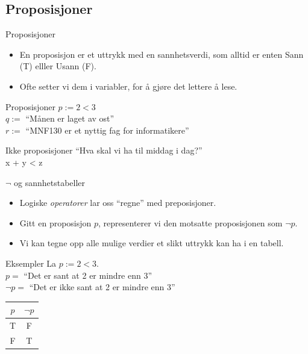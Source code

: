 \subsection{Proposisjoner}

\begin{frame}{Proposisjoner}
    \begin{itemize}
        \item En proposisjon er et uttrykk med en sannhetsverdi, som alltid er enten Sann (T) elller Usann (F).
        \item Ofte setter vi dem i variabler, for å gjøre det lettere å lese.
    \end{itemize}
    \pause
    \begin{block}{Proposisjoner}
        $p := 2 < 3$ \\
        $q := $ ``Månen er laget av ost''\\
        $r := $ ``MNF130 er et nyttig fag for informatikere''
    \end{block}
    \pause
    \begin{block}{Ikke proposisjoner}
        ``Hva skal vi ha til middag i dag?''\\
        x + y < z
    \end{block}
\end{frame}

\begin{frame}{$\lnot$ og sannhetstabeller}
    \begin{itemize}
        \item Logiske \emph{operatorer} lar oss ``regne'' med preposisjoner.
        \item Gitt en proposisjon $p$, representerer vi den motsatte proposisjonen som $\lnot p$.
        \item Vi kan tegne opp alle mulige verdier et slikt uttrykk kan ha i en tabell.
    \end{itemize}
    \pause

    \begin{block}{Eksempler}
        La $p := 2 < 3$. \\
        $p = $ ``Det er sant at 2 er mindre enn 3'' \\
        $\lnot p = $ ``Det er ikke sant at 2 er mindre enn 3''
    \end{block}
    \pause
    \begin{center}
        \begin{tabular}{c|c}
            $p$ & $\lnot p$ \\ \hline
            T & F \\
            F & T \\
        \end{tabular}
    \end{center}
\end{frame}

